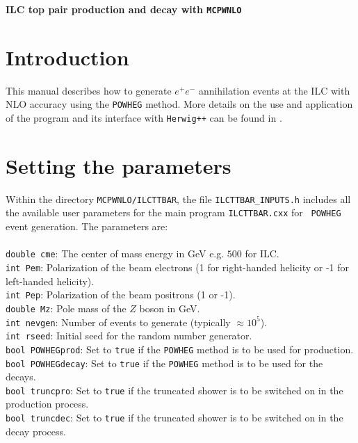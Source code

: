\documentclass[12pt,a4paper,oneside]{article}
\begin{document}
\begin{center}
\Large \textbf {ILC top pair production and decay with {\tt MCPWNLO}} \\
\end{center}
\section{Introduction}
This manual describes how to generate $e^+e^-$ annihilation events at the ILC with NLO accuracy using the {\tt POWHEG} \cite{Nason:2004rx} method. More details on the use and application of the program and its interface with {\tt Herwig++} \cite{Bahr:2008pv} can be found in \cite{LatundeDada:2008bv}.
\section{Setting the parameters}
Within the directory {\tt MCPWNLO/ILCTTBAR}, the file {\tt ILCTTBAR\_INPUTS.h} includes all the available user parameters
for the main program {\tt ILCTTBAR.cxx} for {\tt
  POWHEG} event generation. The parameters are:\\
\\
{\tt double cme}: The center of mass energy in GeV e.g. $500$ for ILC. \\
{\tt  int Pem}: Polarization of the beam electrons (1 for right-handed helicity or -1 for left-handed helicity).\\
{\tt  int Pep}: Polarization of the beam positrons (1 or -1).\\
{\tt double Mz}: Pole mass of the $Z$ boson in GeV.\\
{\tt int nevgen}: Number of events to generate (typically $\approx 10^5$). \\
{\tt int rseed}:  Initial seed for the random number generator. \\ 
{\tt bool POWHEGprod}: Set to {\tt true} if the {\tt POWHEG} method is to be used for production. \\
{\tt bool POWHEGdecay}: Set to {\tt true} if the {\tt POWHEG} method is to be used for the decays. \\
{\tt bool truncpro}: Set to {\tt true} if the truncated shower is to be switched on in the
production process. \\
{\tt bool truncdec}: Set to {\tt true} if the truncated shower is to be switched on in the
decay process.\\
\end{document}
